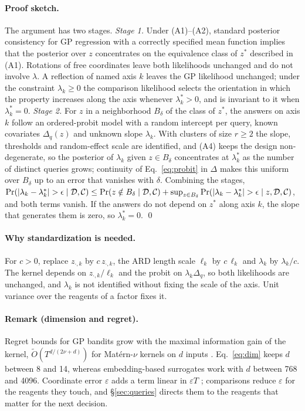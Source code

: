 \paragraph{Proof sketch.}
The argument has two stages. \emph{Stage 1.} Under (A1)--(A2), standard posterior consistency for GP regression with a correctly specified mean function implies that the posterior over $z$ concentrates on the equivalence class of $z^\ast$ described in (A1). Rotations of free coordinates leave both likelihoods unchanged and do not involve $\lambda$. A reflection of named axis $k$ leaves the GP likelihood unchanged; under the constraint $\lambda_k\ge0$ the comparison likelihood selects the orientation in which the property increases along the axis whenever $\lambda_k^\ast>0$, and is invariant to it when $\lambda_k^\ast=0$. \emph{Stage 2.} For $z$ in a neighborhood $B_\delta$ of the class of $z^\ast$, the answers on axis $k$ follow an ordered-probit model with a random intercept per query, known covariates $\Delta_q(z)$ and unknown slope $\lambda_k$. With clusters of size $r\ge2$ the slope, thresholds and random-effect scale are identified, and (A4) keeps the design non-degenerate, so the posterior of $\lambda_k$ given $z\in B_\delta$ concentrates at $\lambda_k^\ast$ as the number of distinct queries grows; continuity of Eq.~\eqref{eq:probit} in $\Delta$ makes this uniform over $B_\delta$ up to an error that vanishes with $\delta$. Combining the stages, $\Pr(|\lambda_k-\lambda_k^\ast|>\epsilon\mid\D,\Cset)\le\Pr(z\notin B_\delta\mid\D,\Cset)+\sup_{z\in B_\delta}\Pr(|\lambda_k-\lambda_k^\ast|>\epsilon\mid z,\D,\Cset)$, and both terms vanish. If the answers do not depend on $z^\ast$ along axis $k$, the slope that generates them is zero, so $\lambda_k^\ast=0$. \qed

\paragraph{Why standardization is needed.}
For $c>0$, replace $z_{\cdot,k}$ by $c\,z_{\cdot,k}$, the ARD length scale $\ell_k$ by $c\,\ell_k$ and $\lambda_k$ by $\lambda_k/c$. The kernel depends on $z_{\cdot,k}/\ell_k$ and the probit on $\lambda_k\Delta_q$, so both likelihoods are unchanged, and $\lambda_k$ is not identified without fixing the scale of the axis. Unit variance over the reagents of a factor fixes it.

\paragraph{Remark (dimension and regret).}
Regret bounds for GP bandits grow with the maximal information gain of the kernel, $\tilde O(T^{d/(2\nu+d)})$ for Mat\'ern-$\nu$ kernels on $d$ inputs \citep{vakili2021information}. Eq.~\eqref{eq:dim} keeps $d$ between 8 and 14, whereas embedding-based surrogates work with $d$ between 768 and 4096. Coordinate error $\varepsilon$ adds a term linear in $\varepsilon T$ \citep{bogunovic2021misspecified}; comparisons reduce $\varepsilon$ for the reagents they touch, and \S\ref{sec:queries} directs them to the reagents that matter for the next decision.

